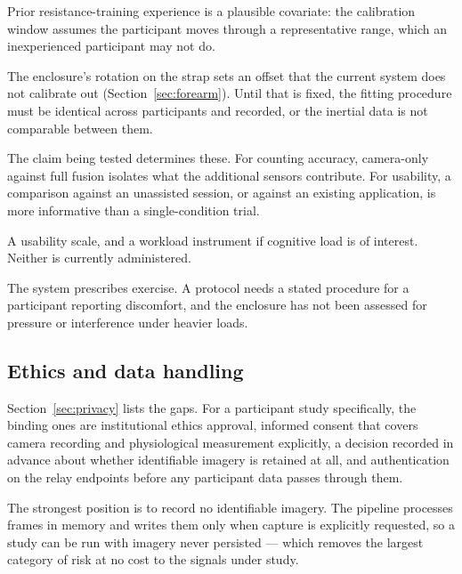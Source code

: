 \documentclass[11pt,a4paper]{article}
\begin{document}
\begin{description}[leftmargin=1.2cm,style=nextline,itemsep=4pt]
\item[Inclusion criteria] Prior resistance-training experience is a plausible
covariate: the calibration window assumes the participant moves through a
representative range, which an inexperienced participant may not do.

\item[Fitting procedure] The enclosure's rotation on the strap sets an offset
that the current system does not calibrate out (Section~\ref{sec:forearm}). Until
that is fixed, the fitting procedure must be identical across participants and
recorded, or the inertial data is not comparable between them.

\item[Comparison conditions] The claim being tested determines these. For
counting accuracy, camera-only against full fusion isolates what the additional
sensors contribute. For usability, a comparison against an unassisted session,
or against an existing application, is more informative than a single-condition
trial.

\item[Instruments] A usability scale, and a workload instrument if cognitive
load is of interest. Neither is currently administered.

\item[Adverse events] The system prescribes exercise. A protocol needs a stated
procedure for a participant reporting discomfort, and the enclosure has not been
assessed for pressure or interference under heavier loads.
\end{description}

\subsection{Ethics and data handling}

Section~\ref{sec:privacy} lists the gaps. For a participant study specifically,
the binding ones are institutional ethics approval, informed consent that
covers camera recording and physiological measurement explicitly, a decision
recorded in advance about whether identifiable imagery is retained at all, and
authentication on the relay endpoints before any participant data passes through
them.

The strongest position is to record no identifiable imagery. The pipeline
processes frames in memory and writes them only when capture is explicitly
requested, so a study can be run with imagery never persisted --- which removes
the largest category of risk at no cost to the signals under study.
\end{document}
